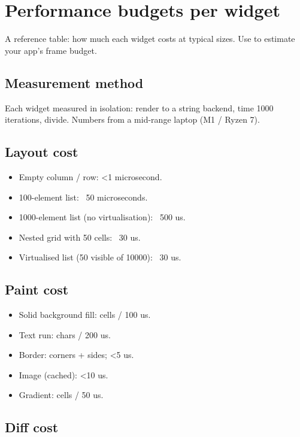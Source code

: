\chapter{Performance budgets per widget}
\label{ch:perfbudget}

\begin{aside}
A reference table: how much each widget costs at typical
sizes. Use to estimate your app's frame budget.
\end{aside}

\section{Measurement method}

Each widget measured in isolation: render to a string
backend, time 1000 iterations, divide. Numbers from a
mid-range laptop (M1 / Ryzen 7).

\section{Layout cost}

\begin{itemize}[leftmargin=*]
  \item Empty column / row: <1 microsecond.
  \item 100-element list: ~50 microseconds.
  \item 1000-element list (no virtualisation): ~500 us.
  \item Nested grid with 50 cells: ~30 us.
  \item Virtualised list (50 visible of 10000): ~30 us.
\end{itemize}

\section{Paint cost}

\begin{itemize}[leftmargin=*]
  \item Solid background fill: cells / 100 us.
  \item Text run: chars / 200 us.
  \item Border: corners + sides; <5 us.
  \item Image (cached): <10 us.
  \item Gradient: cells / 50 us.
\end{itemize}

\section{Diff cost}

